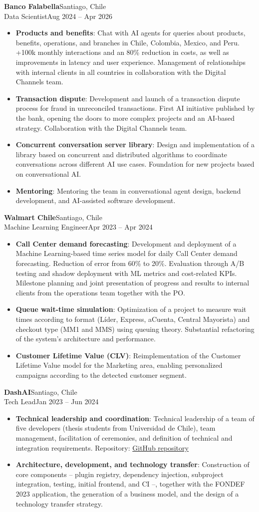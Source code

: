 \documentclass[letterpaper,11pt]{article}
\newcommand{\resumeItem}[2]{
  \item\small{
    \textbf{#1}{: #2\vspace{-2pt}}
  }
}
\newcommand{\resumeSubheading}[4]{%
  \Needspace{7\baselineskip}\vspace{-1pt}\item[]%
    \textbf{#1}\hfill{\small\color{meta}#2}\\[1pt]
    {\small #3}\hfill{\small\color{meta}#4}\vspace{-5pt}%
}
\newcommand{\resumeItemListStart}{\begin{itemize}}
\newcommand{\resumeItemListEnd}{\end{itemize}\vspace{-5pt}}
\begin{document}
    \resumeSubheading
      {Banco Falabella}{Santiago, Chile}
      {Data Scientist}{Aug 2024 -- Apr 2026}
      \resumeItemListStart
      \resumeItem{Products and benefits}
            {Chat with AI agents for queries about products, benefits, operations, and branches in Chile, Colombia, Mexico, and Peru. +100k monthly interactions and an 80\% reduction in costs, as well as improvements in latency and user experience. Management of relationships with internal clients in all countries in collaboration with the Digital Channels team.}
        \resumeItem{Transaction dispute}
          {Development and launch of a transaction dispute process for fraud in unreconciled transactions. First AI initiative published by the bank, opening the doors to more complex projects and an AI-based strategy. Collaboration with the Digital Channels team.}
        \resumeItem{Concurrent conversation server library}
          {Design and implementation of a library based on concurrent and distributed algorithms to coordinate conversations across different AI use cases. Foundation for new projects based on conversational AI.}
        \resumeItem{Mentoring}
          {Mentoring the team in conversational agent design, backend development, and AI-assisted software development.}
      \resumeItemListEnd

    \resumeSubheading
      {Walmart Chile}{Santiago, Chile}
      {Machine Learning Engineer}{Apr 2023 -- Apr 2024}
      \resumeItemListStart
        \resumeItem{Call Center demand forecasting}
          {Development and deployment of a Machine Learning-based time series model for daily Call Center demand forecasting. Reduction of error from 60\% to 20\%. Evaluation through A/B testing and shadow deployment with ML metrics and cost-related KPIs. Milestone planning and joint presentation of progress and results to internal clients from the operations team together with the PO.}
        \resumeItem{Queue wait-time simulation}
          {Optimization of a project to measure wait times according to format (Líder, Express, aCuenta, Central Mayorista) and checkout type (MM1 and MMS) using queuing theory. Substantial refactoring of the system's architecture and performance.}
        \resumeItem{Customer Lifetime Value (CLV)}
          {Reimplementation of the Customer Lifetime Value model for the Marketing area, enabling personalized campaigns according to the detected customer segment.}
      \resumeItemListEnd

    \resumeSubheading
      {DashAI}{Santiago, Chile}
      {Tech Lead}{Jan 2023 -- Jun 2024}
      \resumeItemListStart
        \resumeItem{Technical leadership and coordination}
          {Technical leadership of a team of five developers (thesis students from Universidad de Chile), team management, facilitation of ceremonies, and definition of technical and integration requirements. Repository: \href{https://github.com/DashAISoftware/DashAI}{GitHub repository}}
        \resumeItem{Architecture, development, and technology transfer}
          {Construction of core components -- plugin registry, dependency injection, subproject integration, testing, initial frontend, and CI --, together with the FONDEF 2023 application, the generation of a business model, and the design of a technology transfer strategy.}
      \resumeItemListEnd
\end{document}
